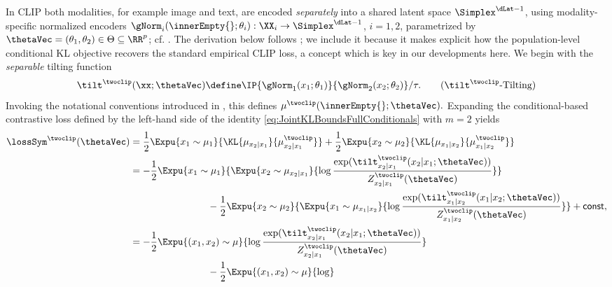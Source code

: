 \documentclass{article}
\begin{document}
\begin{example}[CLIP, $m=2$]\label{ex:CLIP}
 In CLIP both modalities, for example image and text, are encoded \emph{separately}
 into a shared latent space $\Simplex^{\dLat-1}$, using modality-specific
 normalized encoders $\gNorm_i(\innerEmpty{};\theta_i) : \XX_i \to
  \Simplex^{\dLat-1}$, $i=1, 2$, parametrized by $\thetaVec = (\theta_1,
  \theta_2) \in \Theta \subseteq \RR^p$; cf. . 
  The derivation below follows \cite[Thm.
  3.2]{baptistaMathematicalPerspectiveContrastive2025};
  we include it because it makes explicit how the population-level conditional 
  KL objective recovers the standard empirical CLIP loss, a concept which is
  key in our developments here.
 We begin with the \emph{separable} tilting function
 \begin{align}
  \tilt^{\twoclip}(\xx; \thetaVec) \define
  \IP{\gNorm_1(x_1; \theta_1)}{\gNorm_2(x_2;\theta_2)}/\tau.
  \tag{\ensuremath{\tilt^\twoclip}-Tilting}
  \label{eq:ClipTiltingFunctionBiModal}
 \end{align}
 Invoking the notational conventions introduced in ,
 this defines $\mu^{\twoclip}(\innerEmpty{};\thetaVec).$
 Expanding the conditional-based contrastive loss defined by the left-hand
 side of the identity \eqref{eq:JointKLBoundsFullConditionals} with $m=2$
 yields
 \begin{align*}
  \lossSym^{\twoclip}(\thetaVec)
   & = \frac{1}{2}\Expu{x_1 \sim \mu_1}{\KL{\mu_{x_2\vert x_1}}{\mu^{\twoclip}_{x_2\vert x_1}}}
  + \frac{1}{2}\Expu{x_2 \sim \mu_2}{\KL{\mu_{x_1\vert x_2}}{\mu^{\twoclip}_{x_1\vert x_2}}}    \\
   & = -\frac{1}{2}\Expu{x_1 \sim \mu_1}{
   \Expu{x_2 \sim \mu_{x_2\vert x_1}}{
    \log \frac{\exp(\tilt^{\twoclip}_{x_2\vert x_1}(x_2\vert
  x_1;\thetaVec))}{ Z^{\twoclip}_{x_2\vert x_1}(\thetaVec)}}}                                   \\
   & \qquad\qquad\qquad\qquad-\frac{1}{2} \Expu{x_2 \sim\mu_2}{
   \Expu{x_1 \sim \mu_{x_1\vert x_2}}{\log
    \frac{\exp(\tilt^{\twoclip}_{x_1\vert x_2}(x_1\vert x_2;\thetaVec))}{ Z^{\twoclip}_{
  x_1\vert x_2}(\thetaVec)}}} + \mathsf{const},                                                 \\
   & = -\frac{1}{2}\Expu{(x_1,x_2) \sim \mu}{
   \log \frac{\exp(\tilt^{\twoclip}_{x_2\vert x_1}(x_2\vert
  x_1;\thetaVec))}{ Z^{\twoclip}_{x_2\vert x_1}(\thetaVec)}}                                    \\
   & \qquad\qquad\qquad\qquad-\frac{1}{2} \Expu{(x_1,x_2) \sim\mu}{\log
}
\end{align*}
\end{example}
\end{document}
